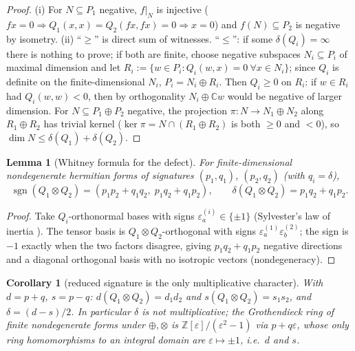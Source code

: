 \documentclass[11pt,reqno]{amsart}
\newtheorem{lemma}[theorem]{Lemma}
\newtheorem{corollary}[theorem]{Corollary}
\theoremstyle{definition}
\newcommand{\C}{\mathbb{C}}
\newcommand{\Z}{\mathbb{Z}}
\DeclareMathOperator{\sgn}{sgn}
\begin{document}
\begin{proof}
(i) For \(N\subseteq P_1\) negative, \(f|_N\) is injective (\(fx=0\Rightarrow
Q_1(x,x)=Q_2(fx,fx)=0\Rightarrow x=0\)) and \(f(N)\subseteq P_2\) is negative by
isometry. (ii) ``\(\geq\)'' is direct sum of witnesses. ``\(\leq\)'': if some
\(\delta(Q_i)=\infty\) there is nothing to prove; if both are finite, choose
negative subspaces \(N_i\subseteq P_i\) of maximal dimension and let
\(R_i:=\{w\in P_i:Q_i(w,x)=0\ \forall x\in N_i\}\); since \(Q_i\) is definite on
the finite-dimensional \(N_i\), \(P_i=N_i\oplus R_i\). Then \(Q_i\geq0\) on
\(R_i\): if \(w\in R_i\) had \(Q_i(w,w)<0\), then by orthogonality
\(N_i\oplus\C w\) would be negative of larger dimension. For \(N\subseteq P_1\oplus P_2\) negative, the projection
\(\pi\colon N\to N_1\oplus N_2\) along \(R_1\oplus R_2\) has trivial kernel
(\(\ker\pi=N\cap(R_1\oplus R_2)\) is both \(\geq0\) and \(<0\)), so
\(\dim N\leq\delta(Q_1)+\delta(Q_2)\).
\end{proof}

\begin{lemma}[Whitney formula for the defect]\label{lem:whitney}
For finite-dimensional nondegenerate hermitian forms of signatures
\((p_1,q_1)\), \((p_2,q_2)\) (with \(q_i=\delta\)),
\[
\sgn(Q_1\otimes Q_2)=(p_1p_2+q_1q_2,\;p_1q_2+q_1p_2),
\qquad
\delta(Q_1\otimes Q_2)=p_1q_2+q_1p_2 .
\]
\end{lemma}

\begin{proof}
Take \(Q_i\)-orthonormal bases with signs \(\varepsilon^{(i)}_a\in\{\pm1\}\)
(Sylvester's law of inertia \cite{Gantmacher}). The tensor basis is \(Q_1\otimes Q_2\)-orthogonal with signs
\(\varepsilon^{(1)}_a\varepsilon^{(2)}_b\); the sign is \(-1\) exactly when the
two factors disagree, giving \(p_1q_2+q_1p_2\) negative directions and a
diagonal orthogonal basis with no isotropic vectors (nondegeneracy).
\end{proof}

\begin{corollary}[reduced signature is the only multiplicative character]
\label{cor:character}
With \(d=p+q\), \(s=p-q\): \(d(Q_1\otimes Q_2)=d_1d_2\) and
\(s(Q_1\otimes Q_2)=s_1s_2\), and \(\delta=(d-s)/2\). In particular
\(\delta\) is not multiplicative; the Grothendieck ring of finite nondegenerate
forms under \(\oplus,\otimes\) is \(\Z[\varepsilon]/(\varepsilon^2-1)\) via
\(p+q\varepsilon\), whose only ring homomorphisms to an integral domain are
\(\varepsilon\mapsto\pm1\), i.e.\ \(d\) and \(s\).
\end{corollary}
\end{document}
